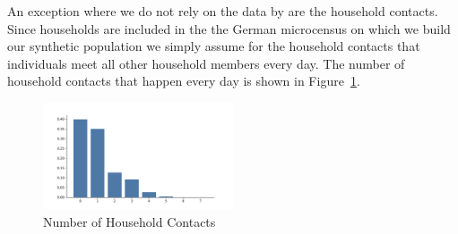 \FloatBarrier

An exception where we do not rely on the data by \cite{Mossong2008} are the household
contacts. Since households are included in the the German microcensus
\citep{FDSAeDBUDL2018} on which we build our synthetic population we simply assume for
the household contacts that individuals meet all other household members every day. The
number of household contacts that happen every day is shown in
Figure~\ref{fig:n_contacts_hh}.

\begin{figure}
    \centering
    \includegraphics[width=0.5\textwidth]{figures/results/figures/data/distributions_of_the_number_of_contacts/household}
    \caption{Number of Household Contacts}
    \label{fig:n_contacts_hh}
\end{figure}

\FloatBarrier